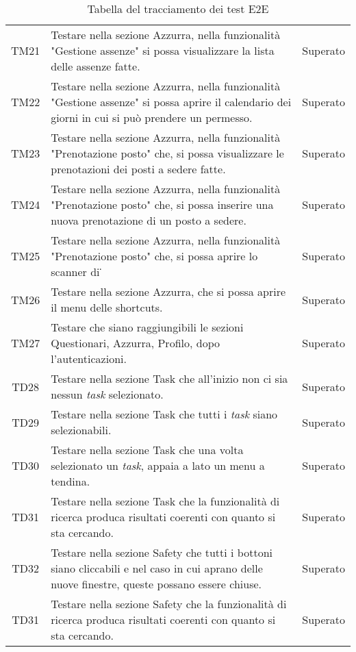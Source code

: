 \begin{table}[h]%
	\renewcommand{\arraystretch}{1.6}
	\centering
	\begin{tabularx}{\textwidth}{c X c}
		\hline	
		\rowcolor{heavenly}
		\intest{Codice} &  \intest{Descrizione} & \intest{Esito}\\	
		\hline	
		TM21 & Testare nella sezione Azzurra, nella funzionalità "Gestione assenze" si possa visualizzare la lista delle assenze fatte. & Superato\\
		TM22 & Testare nella sezione Azzurra, nella funzionalità "Gestione assenze" si possa aprire il calendario dei giorni in cui si può prendere un permesso. & Superato\\
		TM23 & Testare nella sezione Azzurra, nella funzionalità "Prenotazione posto" che, si possa visualizzare le prenotazioni dei posti a sedere fatte. & Superato\\
		TM24 & Testare nella sezione Azzurra, nella funzionalità "Prenotazione posto" che, si possa inserire una nuova prenotazione di un posto a sedere. & Superato\\
		TM25 & Testare nella sezione Azzurra, nella funzionalità "Prenotazione posto" che, si possa aprire lo scanner di \g{QR code}\. & Superato\\
		TM26 & Testare nella sezione Azzurra, che si possa aprire il menu delle shortcuts. & Superato\\
		TM27 & Testare che siano raggiungibili le sezioni Questionari, Azzurra, Profilo, dopo l'autenticazioni. & Superato \\
		TD28 & Testare nella sezione Task che all'inizio non ci sia nessun \emph{task} selezionato. & Superato \\
		TD29 & Testare nella sezione Task che tutti i \emph{task} siano selezionabili. & Superato \\
		TD30 & Testare nella sezione Task che una volta selezionato un \emph{task}, appaia a lato un menu a tendina. & Superato \\
		TD31 & Testare nella sezione Task che la funzionalità di ricerca produca risultati coerenti con quanto si sta cercando. & Superato \\
		TD32 & Testare nella sezione Safety che tutti i bottoni siano cliccabili e nel caso in cui aprano delle nuove finestre, queste possano essere chiuse. & Superato \\
		TD31 & Testare nella sezione Safety che la funzionalità di ricerca produca risultati coerenti con quanto si sta cercando. & Superato \\
		\hline
	\end{tabularx} \hbox{}
	\caption{Tabella del tracciamento dei test E2E}
\end{table}%
